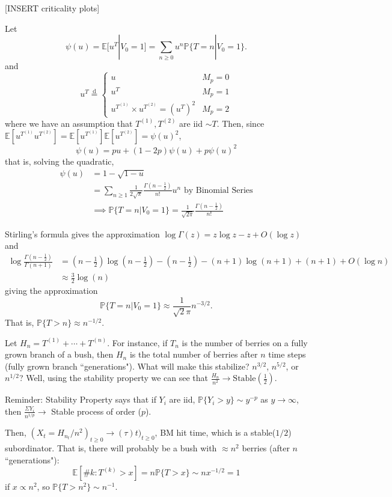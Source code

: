 \documentclass[12pt]{amsart}
\newcommand{\disteq}{\overset{ \text{d} }{=}}
\newcommand{\E}{\mathbb{E}}    %
\renewcommand{\P}{\mathbb{P}}  %
\theoremstyle{definition}
\begin{document}
[INSERT criticality plots]

\bigskip{}
\noindent{}Let 
$$
\psi (u) = \E [u^T | V_0 = 1 ] = \sum_{n \geq 0} u^n \P \{ T = n | V_0 = 1 \}.
$$ 
and
$$
u^T \disteq 
\begin{cases}
u &  M_p = 0 \\
u^T	&	M_p = 1\\
u^{T^{(1)}} \times u^{T^{(2)}} = (u^T)^2	&	M_p = 2
\end{cases}
$$
where we have an assumption that $T^{(1)}, T^{(2)}$ are iid $\sim T$. Then, since $\E [ u^{T^{(1)}} u^{T^{(2)}} ] = \E [ u^{T^{(1)}} ] \E [u^{T^{(2)}} ]  = \psi(u)^2$, 
$$
\psi(u) = pu + (1-2p) \psi(u) + p \psi(u)^2
$$
that is, solving the quadratic,
\begin{align*}
\psi(u) 
	&= 1 - \sqrt{1 - u} \\
	&= \sum_{n \geq 1} \frac{1}{2 \sqrt{\pi}} \frac{ \Gamma (n - \tfrac{1}{2}) }{n!} u^n \text{ by Binomial Series} \\
	&\implies \P \{ T = n | V_0 = 1 \} = \frac{1}{ \sqrt{2 \pi} } \frac{ \Gamma (n - \tfrac{1}{2}) }{n!}
\end{align*}

Stirling's formula gives the approximation $
\log \Gamma(z) 
	= z \log z - z + O(\log z)
$
and
\begin{align*}
\log \frac{ \Gamma(n - \tfrac{1}{2}) }{ \Gamma(n+1) }
	&= (n-\tfrac{1}{2}) \log (n - \tfrac{1}{2}) - (n - \tfrac{1}{2}) - (n+1) \log (n+1) + (n+1) + O(\log n) \\
	&\approx \tfrac{3}{2} \log (n)
\end{align*}
giving the approximation 
$$
\P \{ T = n | V_0 = 1 \} \approx  \frac{1}{\sqrt{2} \pi} n^{-3/2}.
$$ 
That is, $\P \{ T > n \} \approx n^{-1/2}$. \newline{}

\noindent{}Let $H_n = T^{(1)} + \cdots + T^{(n)}$. For instance, if $T_n$ is the number of berries on a fully grown branch of a bush, then $H_n$ is the total number of berries after $n$ time steps (fully grown branch ``generations"). What will make this stabilize? $n^{3/2}$, $n^{5/2}$, or $n^{1/2}$? Well, using the stability property we can see that $\frac{H_n}{n^2} \to \text{Stable}(\tfrac{1}{2})$.

\bigskip{}

Reminder: Stability Property says that if $Y_i$ are iid, $\P \{ Y_i > y \} \sim y^{-p}$ as $y \to \infty$, then $\frac{\Sigma Y_i}{n^{1/p}} \to$ Stable process of order ($p$). 

\bigskip{}

Then, $\left(X_t = H_{n_t} / n^2 \right)_{t \geq 0} \to (\tau)t )_{t \geq 0}$, BM hit time, which is a stable($1/2$) subordinator. That is, there will probably be a bush with $\approx n^2$ berries (after $n$ ``generations"):
$$
\E [ \# k : T^{(k)} > x] = n \P \{ T > x \} \sim n x^{-1/2} = 1
$$
if $x \propto n^2$, so $\P \{ T > n^2 \} \sim n^{-1}$.
\end{document}
